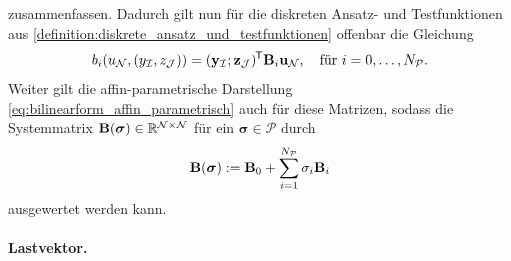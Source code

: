 \documentclass[../main.tex]{subfiles}
\begin{document}
zusammenfassen.
Dadurch gilt nun für die diskreten Ansatz- und Testfunktionen aus \cref{definition:diskrete_ansatz_und_testfunktionen} offenbar die Gleichung
\begin{equation}
    b_{i}(u_{\mathcal N}, (y_{\mathcal I}, z_{\mathcal J})) = (\mathbf{y}_{\mathcal I}; \mathbf{z}_{\mathcal J})^{\mkern-1.5mu\mathsf{T}} \mathbf{B}_{i} \mathbf{u}_{\mathcal N}, \quad \text{für } i = 0, \dots, N_{\mathcal P}.
\end{equation}
Weiter gilt die affin-parametrische Darstellung \cref{eq:bilinearform_affin_parametrisch} auch für diese Matrizen, sodass die Systemmatrix $\mathbf{B}(\bm \sigma) \in \mathbb{R}^{\mathcal N \times \mathcal N}$ für ein $\bm \sigma \in \mathcal P$ durch
\begin{equation}
    \mathbf{B}(\bm \sigma) := \mathbf{B}_{0} + \sum_{i = 1}^{N_{\mathcal P}} \sigma_{i} \mathbf{B}_{i}
\end{equation}
ausgewertet werden kann.


\paragraph{Lastvektor.} %
\label{par:lastvektor}
\end{document}
